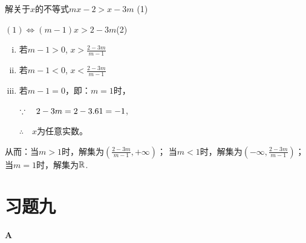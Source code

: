 \begin{example}
    解关于$x$的不等式$mx-2>x-3m$ \hfill(1)
\end{example}

\begin{solution}
    $(1)\Longleftrightarrow (m-1)x>2-3m$\hfill (2)
\begin{enumerate}[(i)]
    \item 若$m-1>0$, $x>\frac{2-3m}{m-1}$
    \item 若$m-1<0$, $x<\frac{2-3m}{m-1}$
    \item 若$m-1=0$，即：$m=1$时，

$\because\quad     2-3m=2-3.61=-1$,

$\therefore\quad  x$为任意实数。   
\end{enumerate}

从而：当$m>1$时，解集为$\left(\frac{2-3m}{m-1},+\infty\right)$；
当$m<1$时，解集为$\left(-\infty, \frac{2-3m}{m-1}\right)$；
当$m=1$时，解集为$\mathbb{R}$.
\end{solution}

\section*{习题九}
\begin{center}
    \bfseries A
\end{center}

